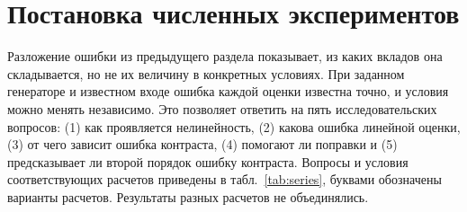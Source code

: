 
\section{Постановка численных экспериментов}
\label{sec:simulation}

Разложение ошибки из предыдущего раздела показывает, из каких вкладов она складывается, но не их величину в конкретных условиях. При заданном генераторе и известном входе ошибка каждой оценки известна точно, и условия можно менять независимо. Это позволяет ответить на пять исследовательских вопросов: (1) как проявляется нелинейность, (2) какова ошибка линейной оценки, (3) от чего зависит ошибка контраста, (4) помогают ли поправки и (5) предсказывает ли второй порядок ошибку контраста. Вопросы и условия соответствующих расчетов приведены в табл.~\ref{tab:series}, буквами обозначены варианты расчетов. Результаты разных расчетов не объединялись.


